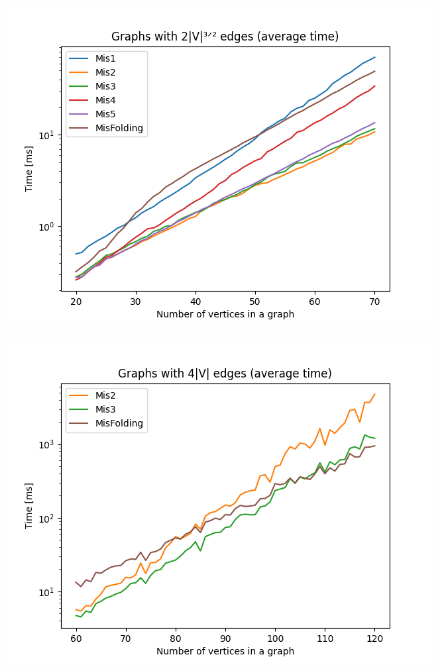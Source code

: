 \begin{figure}[H]
\includegraphics[width=\textwidth]{4_benchmark/plots/2n32.png}
\centering
\end{figure}

\begin{figure}[H]
\includegraphics[width=\textwidth]{4_benchmark/plots/big4n.png}
\centering
\end{figure}

